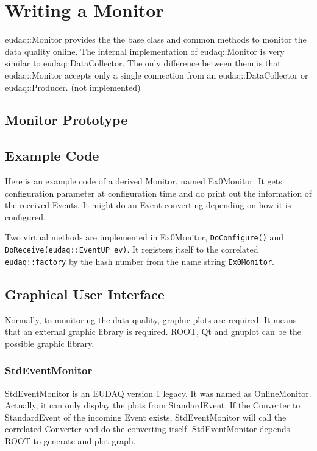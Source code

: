 \section{Writing a Monitor}\label{sec:MonitorWriting}
eudaq::Monitor provides the the base class and common methods to monitor the data quality online. The internal implementation of eudaq::Monitor is very similar to eudaq::DataCollector. The only difference between them is that eudaq::Monitor accepts only a single connection from an eudaq::DataCollector or eudaq::Producer. (not implemented)\\

\subsection{Monitor Prototype}\label{sec:monitor_hh}



\subsection{Example Code}
Here is an example code of a derived Monitor, named Ex0Monitor. It gets configuration parameter at configuration time and do print out the information of the received Events. It might do an Event converting depending on how it is configured.

Two virtual methods are implemented in Ex0Monitor, \lstinline[style=cpp]{DoConfigure()} and \lstinline[style=cpp]{DoReceive(eudaq::EventUP ev)}. It registers itself to the correlated \lstinline[style=cpp]{eudaq::factory} by the hash number from the name string \lstinline[style=cpp]{Ex0Monitor}.

\subsection{Graphical User Interface}
Normally, to monitoring the data quality, graphic plots are required. It means that an external graphic library is required. ROOT, Qt
and gnuplot can be the possible graphic library.

\subsubsection{StdEventMonitor}
StdEventMonitor is an EUDAQ version 1 legacy. It was named as OnlineMonitor. Actually, it can only display the plots from StandardEvent. If the Converter to StandardEvent of the incoming Event exists, StdEventMonitor will call the correlated Converter and do the converting itself.
StdEventMonitor depends ROOT to generate and plot graph.

